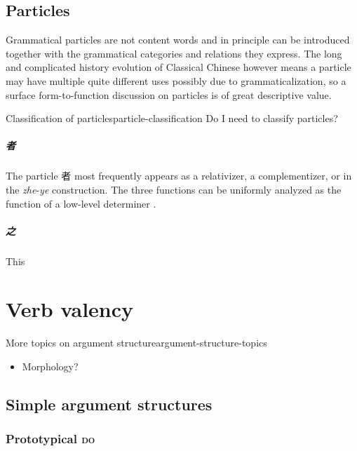 \documentclass[UTF8, a4paper, oneside, scheme=plain, 12pt]{ctexrep}
\newcommand{\form}[1]{\emph{#1}}
\newcommand*{\category}[1]{\textsc{#1}}
\begin{document}
\section{Particles}

Grammatical particles are not content words
and in principle can be introduced together with the grammatical categories and relations they express.
The long and complicated history evolution of Classical Chinese
however means a particle may have multiple quite different uses
possibly due to grammaticalization,
so a surface form-to-function discussion on particles is of great descriptive value.

\begin{todobox}{Classification of particles}{particle-classification}
    Do I need to classify particles?
\end{todobox}

\paragraph*{者} The particle 者 most frequently appears as a relativizer, a complementizer,
or in the \form{zhe}-\form{ye} construction.
The three functions can be uniformly analyzed as the function of a low-level determiner \citep{aldridge2009old}. 

\paragraph*{之} This 

\chapter{Verb valency}

\begin{todobox}{More topics on argument structure}{argument-structure-topics}
    \begin{itemize}
        \item Morphology?
    \end{itemize}
\end{todobox}

\section{Simple argument structures}
\label{sec:grammatical.clause.verbal.argument.simple}

\subsection{Prototypical \category{do}}
\label{sec:valency.simple.do}
\end{document}
